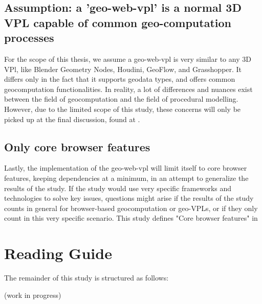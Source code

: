 \subsection*{Assumption: a '\ac{geo-web-vpl}' is a normal 3D VPL capable of common geo-computation processes}
For the scope of this thesis, we assume a \ac{geo-web-vpl} is very similar to any 3D VPl, like Blender Geometry Nodes, Houdini, GeoFlow, and Grasshopper. 
It differs only in the fact that it supports geodata types, and offers common geocomputation functionalities. 
In reality, a lot of differences and nuances exist between the field of geocomputation and the field of procedural modelling. 
However, due to the limited scope of this study, these concerns will only be picked up at the final discussion, found at .
 
\subsection*{Only core browser features}
Lastly, the implementation of the geo-web-vpl will limit itself to core browser features, keeping dependencies at a minimum, in an attempt to generalize the results of the study.
If the study would use very specific frameworks and technologies to solve key issues, questions might arise if the results of the study counts in general for browser-based geocomputation or geo-VPLs, or if they only count in this very specific scenario. 
This study defines "Core browser features" in 

\newpage
\section{Reading Guide}

The remainder of this study is structured as follows:

(work in progress)

